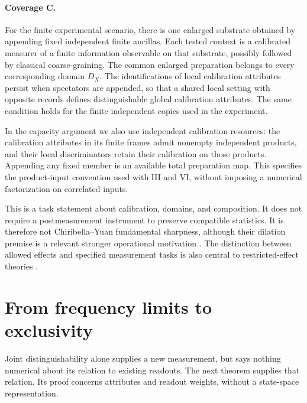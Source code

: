 \documentclass[a4paper,11pt,twocolumn,unpublished]{quantumarticle}
\begin{document}
\paragraph{Coverage C.}
For the finite experimental scenario, there is one enlarged substrate obtained by appending fixed independent finite ancillas. Each tested context is a calibrated measurer of a finite information observable on that substrate, possibly followed by classical coarse-graining. The common enlarged preparation belongs to every corresponding domain $D_X$. The identifications of local calibration attributes persist when spectators are appended, so that a shared local setting with opposite records defines distinguishable global calibration attributes. The same condition holds for the finite independent copies used in the experiment.

In the capacity argument we also use independent calibration resources: the calibration attributes in its finite frames admit nonempty independent products, and their local discriminators retain their calibration on those products. Appending any fixed member is an available total preparation map. This specifies the product-input convention used with III and VI, without imposing a numerical factorization on correlated inputs.

This is a task statement about calibration, domains, and composition. It does not require a postmeasurement instrument to preserve compatible statistics. It is therefore not Chiribella--Yuan fundamental sharpness, although their dilation premise is a relevant stronger operational motivation \cite[Principle 1 and the reduction to sharp measurements]{sharp}. The distinction between allowed effects and specified measurement tasks is also central to restricted-effect theories \cite[Sec.~IV]{restricted}.

\section{From frequency limits to exclusivity}
Joint distinguishability alone supplies a new measurement, but says nothing numerical about its relation to existing readouts. The next theorem supplies that relation. Its proof concerns attributes and readout weights, without a state-space representation.
\end{document}
